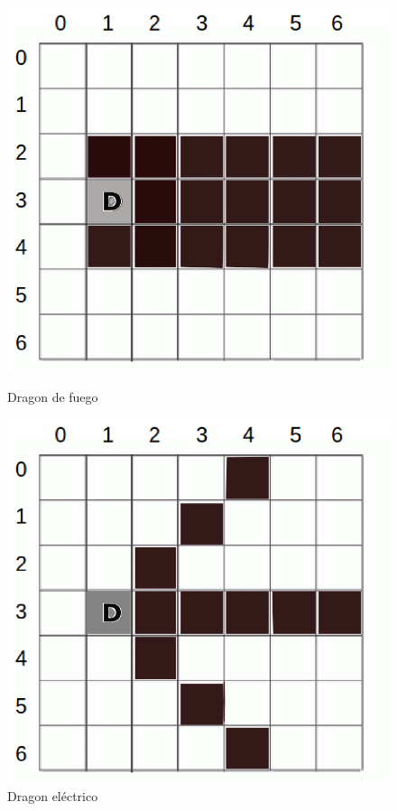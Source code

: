 \documentclass[letter,10pt]{article}
\begin{document}
\begin{figure}[h!]
  \begin{center}
  	\includegraphics[scale=0.25]{dragon1}\caption{Dragon de fuego}
	\includegraphics[scale=0.25]{dragon2}\caption{Dragon eléctrico}
  \end{center} 
\end{figure}
\end{document}
